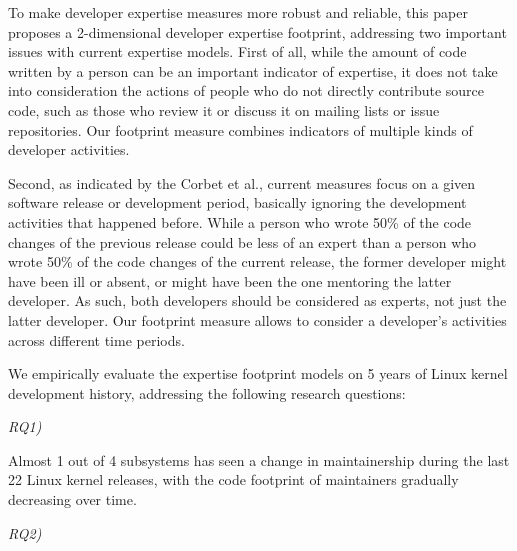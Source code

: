 To make developer expertise measures more robust and reliable, this paper proposes a 2-dimensional developer expertise footprint, addressing two important issues with current expertise models. First of all, while the amount of code written by a person can be an important indicator of expertise, %
it does not take into consideration the actions of people who do not directly contribute
source code, such as those who review it or discuss it on mailing lists or issue repositories. Our footprint measure combines indicators of multiple kinds of developer activities.

Second, as indicated by the Corbet et al., current measures focus on a given software release or development period, basically ignoring the development activities that happened before. %
While a person who wrote 50\% of the code changes of the previous release could be less of an expert than a person who
wrote 50\% of the code changes of the current release, the former developer might have been ill or absent, or might have been the one mentoring the latter developer. As such, both developers should be considered as experts, not just the latter developer. Our footprint measure allows to consider a developer's activities across different time periods.

We empirically evaluate the expertise footprint models on 5 years of Linux kernel development history, addressing the following research questions:

\begin{description}
\item[\textit{RQ1)}] \textit{\rqone }
\end{description}

\begin{myindentpar}{1cm}
Almost 1 out of 4 subsystems has seen a change in maintainership during the last 22 Linux kernel releases, with the code footprint of maintainers gradually decreasing over time.
\end{myindentpar}

\begin{description}
\item[\textit{RQ2)}] \textit{\rqtwo }
\end{description}

